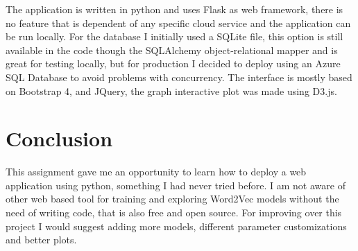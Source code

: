 \documentclass[table,xcdraw]{article}
\begin{document}
The application is written in python and uses Flask as web framework, there is no feature that is dependent of any specific cloud service and the application can be run locally.
For the database I initially used a SQLite file, this option is still available in the code though the SQLAlchemy object-relational mapper and is great for testing locally, but for production I decided to deploy using an Azure SQL Database to avoid problems with concurrency.
The interface is mostly based on Bootstrap 4, and JQuery, the graph interactive plot was made using D3.js.

\section{Conclusion}

This assignment gave me an opportunity to learn how to deploy a web application using python, something I had never tried before.
I am not aware of other web based tool for training and exploring Word2Vec models without the need of writing code, that is also free and open source.
For improving over this project I would suggest adding more models, different parameter customizations and better plots.
\end{document}
